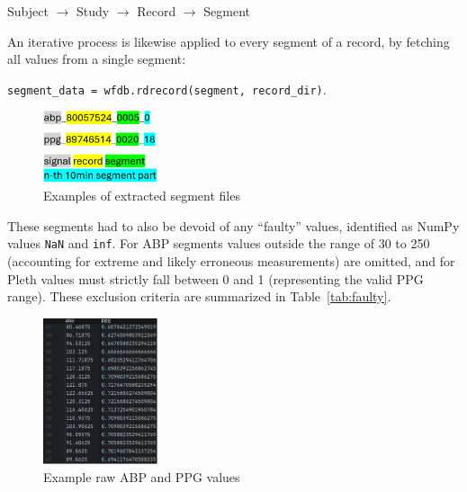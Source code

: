 \vspace{0.1cm}
{\centering Subject $\rightarrow$ Study $\rightarrow$ Record $\rightarrow$ Segment\par}
\vspace{0.1cm}

An iterative process is likewise applied to every segment of a record, by fetching all values from a single segment:

\vspace{0.1cm}
{\centering \texttt{segment\_data = wfdb.rdrecord(segment, record\_dir)}.\par}
\vspace{0.1cm}

\begin{figure}
    \vspace{-0.5cm}
    \begin{center}
        \includegraphics[width=0.3\textwidth]{images/methods/segments}
    \end{center}
    \vspace*{-7mm}
    \captionsetup{format=plain, justification=centering, font=small}
    \caption{Examples of extracted segment files}
    \label{fig:segments}
\end{figure}

\noindent These segments had to also be devoid of any \enquote{faulty} values, identified as NumPy values \texttt{NaN} and \texttt{inf}.
For ABP segments values outside the range of 30 to 250 (accounting for extreme and likely erroneous measurements) are omitted, and for Pleth values must strictly fall between 0 and 1 (representing the valid PPG range).
These exclusion criteria are summarized in Table~\ref{tab:faulty}.

\begin{figure}
    \vspace{-1cm}
    \begin{center}
        \includegraphics[width=0.3\textwidth]{images/methods/values}
    \end{center}
    \vspace*{-7mm}
    \captionsetup{format=plain, justification=centering}
    \caption{\small Example raw ABP and PPG values}
    \label{fig:values}
\end{figure}

